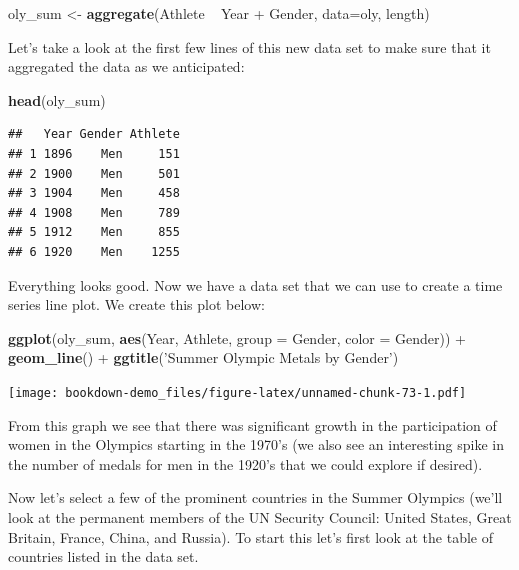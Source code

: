 \documentclass[]{book}
\newenvironment{Shaded}{\begin{snugshade}}{\end{snugshade}}
\newcommand{\KeywordTok}[1]{\textcolor[rgb]{0.13,0.29,0.53}{\textbf{{#1}}}}
\newcommand{\DataTypeTok}[1]{\textcolor[rgb]{0.13,0.29,0.53}{{#1}}}
\newcommand{\StringTok}[1]{\textcolor[rgb]{0.31,0.60,0.02}{{#1}}}
\newcommand{\NormalTok}[1]{{#1}}
\begin{document}
\begin{Shaded}
\begin{Highlighting}[]
\NormalTok{oly_sum <-}\StringTok{ }\KeywordTok{aggregate}\NormalTok{(Athlete ~}\StringTok{ }\NormalTok{Year +}\StringTok{ }\NormalTok{Gender, }\DataTypeTok{data=}\NormalTok{oly, length)}
\end{Highlighting}
\end{Shaded}

Let's take a look at the first few lines of this new data set to make
sure that it aggregated the data as we anticipated:

\begin{Shaded}
\begin{Highlighting}[]
\KeywordTok{head}\NormalTok{(oly_sum)}
\end{Highlighting}
\end{Shaded}

\begin{verbatim}
##   Year Gender Athlete
## 1 1896    Men     151
## 2 1900    Men     501
## 3 1904    Men     458
## 4 1908    Men     789
## 5 1912    Men     855
## 6 1920    Men    1255
\end{verbatim}

Everything looks good. Now we have a data set that we can use to create
a time series line plot. We create this plot below:

\begin{Shaded}
\begin{Highlighting}[]
\KeywordTok{ggplot}\NormalTok{(oly_sum, }\KeywordTok{aes}\NormalTok{(Year, Athlete, }\DataTypeTok{group =} \NormalTok{Gender, }\DataTypeTok{color =} \NormalTok{Gender)) +}\StringTok{ }\KeywordTok{geom_line}\NormalTok{() +}\StringTok{ }\KeywordTok{ggtitle}\NormalTok{(}\StringTok{'Summer Olympic Metals by Gender'}\NormalTok{)}
\end{Highlighting}
\end{Shaded}

\texttt{[image: bookdown-demo\_files/figure-latex/unnamed-chunk-73-1.pdf]}

From this graph we see that there was significant growth in the
participation of women in the Olympics starting in the 1970's (we also
see an interesting spike in the number of medals for men in the 1920's
that we could explore if desired).

Now let's select a few of the prominent countries in the Summer Olympics
(we'll look at the permanent members of the UN Security Council: United
States, Great Britain, France, China, and Russia). To start this let's
first look at the table of countries listed in the data set.
\end{document}
